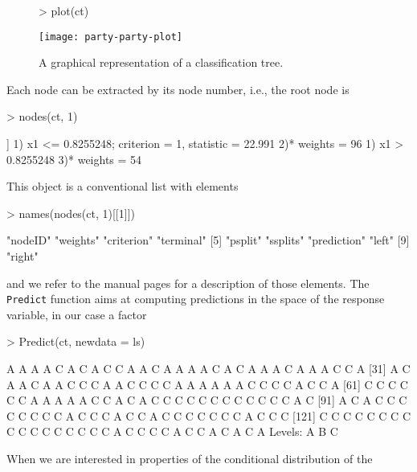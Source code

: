 \documentclass[letter]{article}
\begin{document}
\begin{figure}[t]
\begin{center}
\begin{Schunk}
\begin{Sinput}
> plot(ct)
\end{Sinput}
\end{Schunk}
\texttt{[image: party-party-plot]}
\caption{A graphical representation of a classification tree.
\label{party-plot1}}
\end{center}
\end{figure}

Each node can be extracted by its node number, i.e., the root node is
\begin{Schunk}
\begin{Sinput}
> nodes(ct, 1)
\end{Sinput}
\begin{Soutput}
[[1]]
1) x1 <= 0.8255248; criterion = 1, statistic = 22.991
  2)*  weights = 96 
1) x1 > 0.8255248
  3)*  weights = 54 
\end{Soutput}
\end{Schunk}
This object is a conventional list with elements
\begin{Schunk}
\begin{Sinput}
> names(nodes(ct, 1)[[1]])
\end{Sinput}
\begin{Soutput}
[1] "nodeID"     "weights"    "criterion"  "terminal"  
[5] "psplit"     "ssplits"    "prediction" "left"      
[9] "right"     
\end{Soutput}
\end{Schunk}
and we refer to the manual pages for a description of those elements.
The \texttt{Predict} function aims at computing predictions in the space of
the response variable, in our case a factor
\begin{Schunk}
\begin{Sinput}
> Predict(ct, newdata = ls)
\end{Sinput}
\begin{Soutput}
  [1] A A A A C A C A C C A A C A A A A C A C A A A C A A A C C A
 [31] A C A A C A A C C C A A C C C C A A A A A A C C C C A C C A
 [61] C C C C C C A A A A A C C A C A C C C C C C C C C C C C A C
 [91] A C A C C C C C C C C A C C C A C C A C C C C C C C A C C C
[121] C C C C C C C C C C C C C C C C C A C C C C A C C A C A C A
Levels: A B C
\end{Soutput}
\end{Schunk}
When we are interested in properties of the conditional distribution of the
\end{document}
